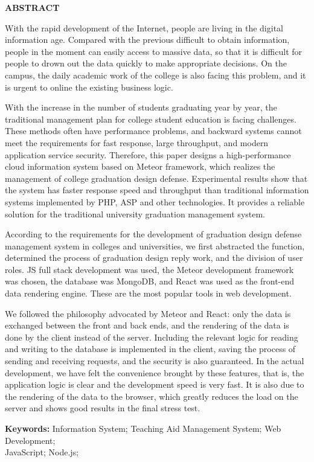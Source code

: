 \begin{center}
	\textbf{ABSTRACT}
\end{center}
\vspace{2em}

With the rapid development of the Internet, people are living in the digital information age. Compared with the previous difficult to obtain information, people in the moment can easily access to massive data, so that it is difficult for people to drown out the data quickly to make appropriate decisions. On the campus, the daily academic work of the college is also facing this problem, and it is urgent to online the existing business logic.

With the increase in the number of students graduating year by year, the traditional management plan for college student education is facing challenges. These methods often have performance problems, and backward systems cannot meet the requirements for fast response, large throughput, and modern application service security. Therefore, this paper designs a high-performance cloud information system based on Meteor framework, which realizes the management of college graduation design defense. Experimental results show that the system has faster response speed and throughput than traditional information systems implemented by PHP, ASP and other technologies. It provides a reliable solution for the traditional university graduation management system.

According to the requirements for the development of graduation design defense management system in colleges and universities, we first abstracted the function, determined the process of graduation design reply work, and the division of user roles. JS full stack development was used, the Meteor development framework was chosen, the database was MongoDB, and React was used as the front-end data rendering engine. These are the most popular tools in web development.

We followed the philosophy advocated by Meteor and React: only the data is exchanged between the front and back ends, and the rendering of the data is done by the client instead of the server. Including the relevant logic for reading and writing to the database is implemented in the client, saving the process of sending and receiving requests, and the security is also guaranteed. In the actual development, we have felt the convenience brought by these features, that is, the application logic is clear and the development speed is very fast. It is also due to the rendering of the data to the browser, which greatly reduces the load on the server and shows good results in the final stress test.

\vspace{1em}
\noindent 
\textbf{Keywords: }Information System; Teaching Aid Management System; Web Development;\\JavaScript; Node.js;

